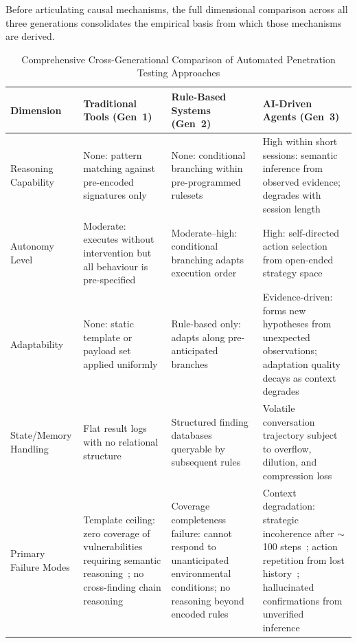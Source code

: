 \documentclass[12pt,a4paper,oneside,openany]{book}
\begin{document}
Before articulating causal mechanisms, the full dimensional comparison across all three generations consolidates the empirical basis from which those mechanisms are derived.

\begin{table}[H]
\centering
\caption{Comprehensive Cross-Generational Comparison of Automated Penetration Testing Approaches}
\label{tab:comprehensive}
\begin{tabularx}{\textwidth}{@{}l>{\raggedright\arraybackslash}X>{\raggedright\arraybackslash}X>{\raggedright\arraybackslash}X@{}}
\toprule
\textbf{Dimension} & \textbf{Traditional Tools (Gen~1)} & \textbf{Rule-Based Systems (Gen~2)} & \textbf{AI-Driven Agents (Gen~3)} \\
\midrule
Reasoning Capability & None: pattern matching against pre-encoded signatures only & None: conditional branching within pre-programmed rulesets & High within short sessions: semantic inference from observed evidence; degrades with session length \\[6pt]
Autonomy Level & Moderate: executes without intervention but all behaviour is pre-specified & Moderate--high: conditional branching adapts execution order & High: self-directed action selection from open-ended strategy space \\[6pt]
Adaptability & None: static template or payload set applied uniformly & Rule-based only: adapts along pre-anticipated branches & Evidence-driven: forms new hypotheses from unexpected observations; adaptation quality decays as context degrades \\[6pt]
State/Memory Handling & Flat result logs with no relational structure & Structured finding databases queryable by subsequent rules & Volatile conversation trajectory subject to overflow, dilution, and compression loss \\[6pt]
Primary Failure Modes & Template ceiling: zero coverage of vulnerabilities requiring semantic reasoning~\cite{diaz2022evaluation}; no cross-finding chain reasoning & Coverage completeness failure: cannot respond to unanticipated environmental conditions; no reasoning beyond encoded rules~\cite{kennedy2011metasploit} & Context degradation: strategic incoherence after ${\sim}$100 steps~\cite{happe2023hackerllm}; action repetition from lost history~\cite{deng2024pentestgpt}; hallucinated confirmations from unverified inference~\cite{ji2023survey} \\
\bottomrule
\end{tabularx}
\end{table}
\end{document}
